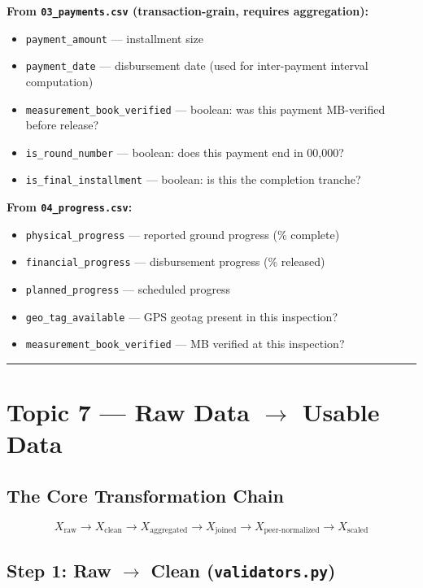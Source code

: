 \documentclass[11pt,a4paper]{article}
\begin{document}
\textbf{From \texttt{03\_payments.csv} (transaction-grain, requires aggregation):}
\begin{itemize}[leftmargin=1.5em, itemsep=2pt, topsep=3pt]
\item \texttt{payment\_amount} --- installment size
\item \texttt{payment\_date} --- disbursement date (used for inter-payment interval computation)
\item \texttt{measurement\_book\_verified} --- boolean: was this payment MB-verified before release?
\item \texttt{is\_round\_number} --- boolean: does this payment end in 00,000?
\item \texttt{is\_final\_installment} --- boolean: is this the completion tranche?
\end{itemize}

\textbf{From \texttt{04\_progress.csv}:}
\begin{itemize}[leftmargin=1.5em, itemsep=2pt, topsep=3pt]
\item \texttt{physical\_progress} --- reported ground progress (\% complete)
\item \texttt{financial\_progress} --- disbursement progress (\% released)
\item \texttt{planned\_progress} --- scheduled progress
\item \texttt{geo\_tag\_available} --- GPS geotag present in this inspection?
\item \texttt{measurement\_book\_verified} --- MB verified at this inspection?
\end{itemize}

\vspace{1em}\hrule\vspace{1em}

\section{Topic 7 --- Raw Data $\rightarrow$ Usable Data}

\subsection{The Core Transformation Chain}

\[ X_\text{raw} \rightarrow X_\text{clean} \rightarrow X_\text{aggregated} \rightarrow X_\text{joined} \rightarrow X_\text{peer-normalized} \rightarrow X_\text{scaled} \]

\subsection{Step 1: Raw $\rightarrow$ Clean (\texttt{validators.py})}
\end{document}
